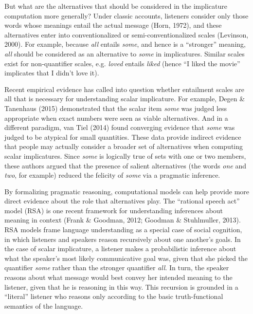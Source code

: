 \documentclass[10pt, letterpaper]{article}
\begin{document}
But what are the alternatives that should be considered in the
implicature computation more generally? Under classic accounts,
listeners consider only those words whose meanings entail the actual
message (Horn, 1972), and these alternatives enter into conventionalized
or semi-conventionalized scales (Levinson, 2000). For example, because
\emph{all} entails \emph{some}, and hence is a ``stronger'' meaning,
\emph{all} should be considered as an alternative to \emph{some} in
implicatures. Similar scales exist for non-quantifier scales, e.g.
\emph{loved} entails \emph{liked} (hence ``I liked the movie''
implicates that I didn't love it).

Recent empirical evidence has called into question whether entailment
scales are all that is necessary for understanding scalar implicature.
For example, Degen \& Tanenhaus (2015) demonstrated that the scalar item
\emph{some} was judged less appropriate when exact numbers were seen as
viable alternatives. And in a different paradigm, van Tiel (2014) found
converging evidence that \emph{some} was judged to be atypical for small
quantities. These data provide indirect evidence that people may
actually consider a broader set of alternatives when computing scalar
implicatures. Since \emph{some} is logically true of sets with one or
two members, these authors argued that the presence of salient
alternatives (the words \emph{one} and \emph{two}, for example) reduced
the felicity of \emph{some} via a pragmatic inference.

By formalizing pragmatic reasoning, computational models can help
provide more direct evidence about the role that alternatives play. The
``rational speech act'' model (RSA) is one recent framework for
understanding inferences about meaning in context (Frank \& Goodman,
2012; Goodman \& Stuhlmuller, 2013). RSA models frame language
understanding as a special case of social cognition, in which listeners
and speakers reason recursively about one another's goals. In the case
of scalar implicature, a listener makes a probabilistic inference about
what the speaker's most likely communicative goal was, given that she
picked the quantifier \emph{some} rather than the stronger quantifier
\emph{all}. In turn, the speaker reasons about what message would best
convey her intended meaning to the listener, given that he is reasoning
in this way. This recursion is grounded in a ``literal'' listener who
reasons only according to the basic truth-functional semantics of the
language.
\end{document}
